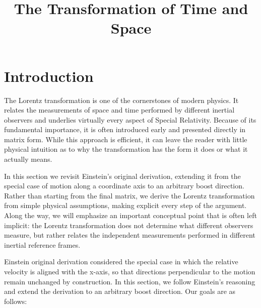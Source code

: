 \documentclass[12pt]{article}
\title{The Transformation of Time and Space}
\author{}
\date{}
\begin{document}
\maketitle
 
\section{Introduction}

The Lorentz transformation is one of the cornerstones of modern physics. It
relates the measurements of space and time performed by different inertial
observers and underlies virtually every aspect of Special Relativity. Because
of its fundamental importance, it is often introduced early and presented
directly in matrix form. While this approach is efficient, it can leave the
reader with little physical intuition as to why the transformation has the form
it does or what it actually means. \par

In this section we revisit Einstein's original derivation, extending it from
the special case of motion along a coordinate axis to an arbitrary boost
direction. Rather than starting from the final matrix, we derive the Lorentz
transformation from simple physical assumptions, making explicit every step of
the argument. Along the way, we will emphasize an important conceptual point
that is often left implicit: the Lorentz transformation does not determine what
different observers measure, but rather relates the independent measurements
performed in different inertial reference frames.\par

 Einstein original derivation considered the special case in which the relative
 velocity is aligned with the x-axis, so that directions perpendicular to the motion remain unchanged by construction. 
In this section, we follow Einstein's reasoning and extend the derivation to an arbitrary boost direction. Our goals are as follows:
\end{document}
